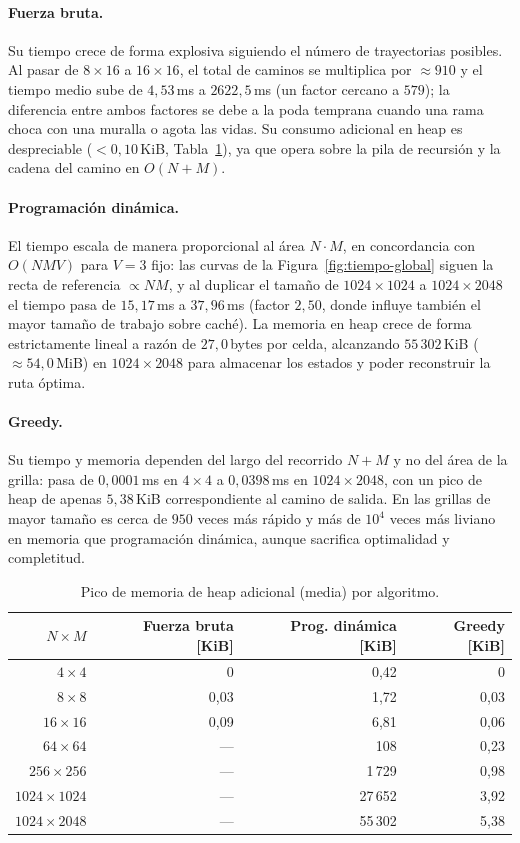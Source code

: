 \paragraph{Fuerza bruta.} Su tiempo crece de forma explosiva siguiendo el número de trayectorias posibles. Al pasar de $8\times16$ a $16\times16$, el total de caminos se multiplica por $\approx 910$ y el tiempo medio sube de $4{,}53$\,ms a $2622{,}5$\,ms (un factor cercano a $579$); la diferencia entre ambos factores se debe a la poda temprana cuando una rama choca con una muralla o agota las vidas. Su consumo adicional en heap es despreciable ($<0{,}10$\,KiB, Tabla~\ref{tab:memoria}), ya que opera sobre la pila de recursión y la cadena del camino en $O(N+M)$.

\paragraph{Programación dinámica.} El tiempo escala de manera proporcional al área $N\cdot M$, en concordancia con $O(NMV)$ para $V=3$ fijo: las curvas de la Figura~\ref{fig:tiempo-global} siguen la recta de referencia $\propto NM$, y al duplicar el tamaño de $1024\times1024$ a $1024\times2048$ el tiempo pasa de $15{,}17$\,ms a $37{,}96$\,ms (factor $2{,}50$, donde influye también el mayor tamaño de trabajo sobre caché). La memoria en heap crece de forma estrictamente lineal a razón de $27{,}0$\,bytes por celda, alcanzando $55\,302$\,KiB ($\approx 54{,}0$\,MiB) en $1024\times2048$ para almacenar los estados y poder reconstruir la ruta óptima.

\paragraph{Greedy.} Su tiempo y memoria dependen del largo del recorrido $N+M$ y no del área de la grilla: pasa de $0{,}0001$\,ms en $4\times4$ a $0{,}0398$\,ms en $1024\times2048$, con un pico de heap de apenas $5{,}38$\,KiB correspondiente al camino de salida. En las grillas de mayor tamaño es cerca de $950$ veces más rápido y más de $10^{4}$ veces más liviano en memoria que programación dinámica, aunque sacrifica optimalidad y completitud.

\begin{table}[ht]
\centering
\small
\begin{tabular}{rrrr}
\hline
$N\times M$ & Fuerza bruta [KiB] & Prog. dinámica [KiB] & Greedy [KiB] \\
\hline
$4\times4$       & 0       & 0{,}42   & 0 \\
$8\times8$       & 0{,}03  & 1{,}72   & 0{,}03 \\
$16\times16$     & 0{,}09  & 6{,}81   & 0{,}06 \\
$64\times64$     & ---     & 108      & 0{,}23 \\
$256\times256$   & ---     & 1\,729   & 0{,}98 \\
$1024\times1024$ & ---     & 27\,652  & 3{,}92 \\
$1024\times2048$ & ---     & 55\,302  & 5{,}38 \\
\hline
\end{tabular}
\caption{Pico de memoria de heap adicional (media) por algoritmo.}
\label{tab:memoria}
\end{table}

